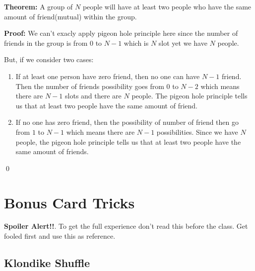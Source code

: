 \documentclass[a4paper, 12pt]{article}
\newcommand{\theorem}{\noindent\textbf{Theorem:} }
\renewcommand{\proof}{\noindent\textbf{Proof:} }
\newcommand{\qedd}{\qed\newline}
\theoremstyle{examplestyle}
\begin{document}
\begin{multicols}{2}
\theorem A group of $N$ people will have at least two people who have the same amount of friend(mutual) within the group.

\proof We can't exacly apply pigeon hole principle here since the number of friends in the group is from $0$ to $N-1$ which is $N$ slot yet we have $N$ people.

But, if we consider two cases:
\begin{enumerate}
\item If at least one person have zero friend, then no one can have $N-1$ friend. Then the number of friends possibility goes from $0$ to $N-2$ which means there are $N-1$ slots and there are $N$ people. The pigeon hole principle tells us that at least two people have the same amount of friend.
\item If no one has zero friend, then the possibility of number of friend then go from $1$ to $N-1$ which means there are $N-1$ possibilities. Since we have $N$ people, the pigeon hole principle tells us that at least two people have the same amount of friends.
\end{enumerate}
\qedd


\section*{Bonus Card Tricks}

\textbf{Spoiler Alert!!}.
To get the full experience don't read this before the class. Get fooled first and use this as reference.

\subsection*{Klondike Shuffle}


\end{multicols}
\end{document}
